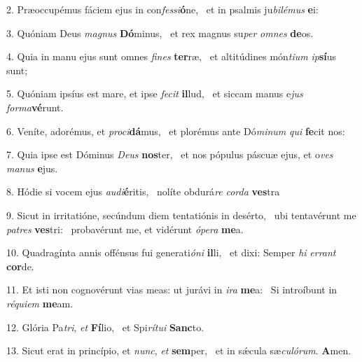 2. Præoccupémus fáciem ejus in con\textit{fes}\textit{si}\textbf{ó}ne, \ast\  et in psalmis ju\textit{bi}\textit{lé}\textit{mus} \textbf{e}i:\

3. Quóniam Deus \textit{ma}\textit{gnus} \textbf{Dó}minus, \ast\  et rex magnus su\textit{per} \textit{om}\textit{nes} \textbf{de}os.\

4. Quia in manu ejus sunt omnes \textit{fi}\textit{nes} \textbf{ter}ræ, \ast\  et altitúdines món\textit{ti}\textit{um} \textit{ip}\textbf{sí}us sunt;\

5. Quóniam ipsíus est mare, et ipse \textit{fe}\textit{cit} \textbf{il}lud, \ast\  et siccam manus e\textit{jus} \textit{for}\textit{ma}\textbf{vé}runt.\

6. Veníte, adorémus, et \textit{pro}\textit{ci}\textbf{dá}mus, \ast\  et plorémus ante Dó\textit{mi}\textit{num} \textit{qui} \textbf{fe}cit nos:\

7. Quia ipse est Dóminus \textit{De}\textit{us} \textbf{nos}ter, \ast\  et nos pópulus páscuæ ejus, et o\textit{ves} \textit{ma}\textit{nus} \textbf{e}jus.\

8. Hódie si vocem ejus \textit{au}\textit{di}\textbf{é}ritis, \ast\  nolíte obdurá\textit{re} \textit{cor}\textit{da} \textbf{ves}tra\

9. Sicut in irritatióne, secúndum diem tentatiónis in desérto, \dag\  ubi tentavérunt me \textit{pa}\textit{tres} \textbf{ves}tri: \ast\  probavérunt me, et vidérunt \textit{ó}\textit{pe}\textit{ra} \textbf{me}a.\

10. Quadragínta annis offénsus fui generati\textit{ó}\textit{ni} \textbf{il}li, \ast\  et dixi: Semper \textit{hi} \textit{er}\textit{rant} \textbf{cor}de.\

11. Et isti non cognovérunt vias meas: ut jurávi in \textit{i}\textit{ra} \textbf{me}a: \ast\  Si introíbunt in \textit{ré}\textit{qui}\textit{em} \textbf{me}am.\

12. Glória Pa\textit{tri}, \textit{et} \textbf{Fí}lio, \ast\  et Spi\textit{rí}\textit{tu}\textit{i} \textbf{Sanc}to.\

13. Sicut erat in princípio, et \textit{nunc}, \textit{et} \textbf{sem}per, \ast\  et in sǽcula sæ\textit{cu}\textit{ló}\textit{rum}. \textbf{A}men.\

